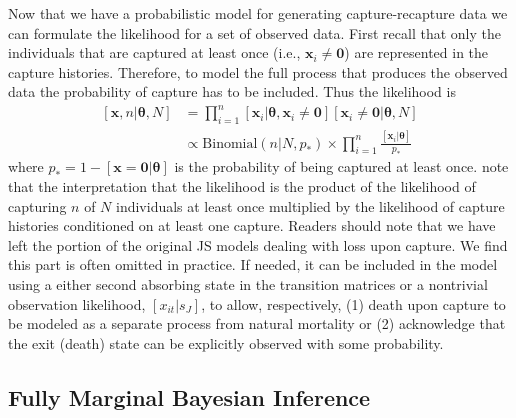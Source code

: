 \documentclass[12pt]{article}
\newcommand{\bx}{\ensuremath{\mathbf{x}}}
\newcommand{\bt}{\ensuremath{\boldsymbol{\theta}}}
\begin{document}
%

Now that we have a probabilistic model for generating capture-recapture data we can formulate the likelihood for a set of observed data. First recall that only the individuals that are captured at least once (i.e., $\bx_i \ne \mathbf{0}$) are represented in the capture histories. Therefore, to model the full process that produces the observed data the probability of capture has to be included. Thus the likelihood is
\begin{equation}
\label{eq.lik}
\begin{aligned}
[\bx,n|\bt,N] &= \prod_{i=1}^n [\bx_i|\bt, \bx_i\ne\mathbf{0}][\bx_i\ne\mathbf{0}|\bt, N] \\
&\propto \text{Binomial}(n|N,p_*) \times \prod_{i=1}^n \frac{[\bx_i|\bt]}{p_*}
\end{aligned}
\end{equation}
where $p_* = 1- [\bx=\mathbf{0}|\bt]$ is the probability of being captured at least once. \cite{king2015capture} note that the interpretation that the likelihood is the product of the likelihood of capturing $n$ of $N$ individuals at least once multiplied by the likelihood of capture histories conditioned on at least one capture. Readers should note that we have left the portion of the original JS models dealing with loss upon capture. We find this part is often omitted in practice. If needed, it can be included in the model using a either second absorbing state in the transition matrices or a nontrivial observation likelihood, $[x_{it}|s_J]$, to allow, respectively, (1) death upon capture to be modeled as a separate process from natural mortality or (2) acknowledge that the exit (death) state can be explicitly observed with some probability. 
 

\subsection{Fully Marginal Bayesian Inference}
\end{document}
